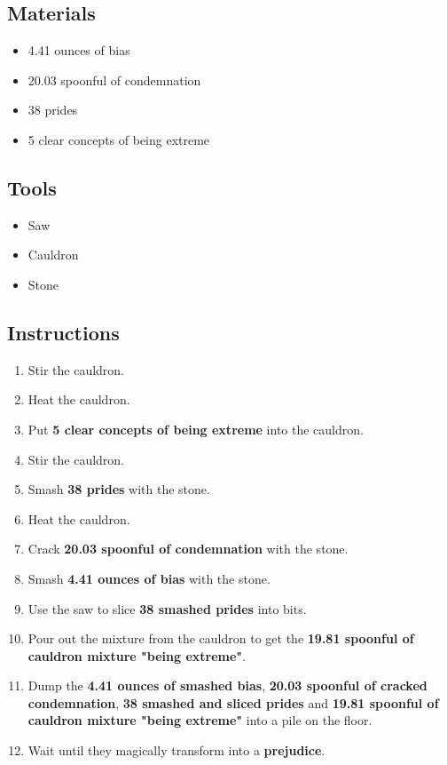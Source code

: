 \documentclass{article}
\begin{document}
\subsection{Materials}\begin{itemize}
\item 
4.41 ounces of bias
\item 
20.03 spoonful of condemnation
\item 
38 prides
\item 
5 clear concepts of being extreme
\end{itemize}
\subsection{Tools}\begin{itemize}
\item 
Saw
\item 
Cauldron
\item 
Stone
\end{itemize}
\subsection{Instructions}\begin{enumerate}
\item 
Stir the cauldron.
\item 
Heat the cauldron.
\item 
Put \textbf{5 clear concepts of being extreme} into the cauldron.
\item 
Stir the cauldron.
\item 
Smash \textbf{38 prides} with the stone.
\item 
Heat the cauldron.
\item 
Crack \textbf{20.03 spoonful of condemnation} with the stone.
\item 
Smash \textbf{4.41 ounces of bias} with the stone.
\item 
Use the saw to slice \textbf{38 smashed prides} into bits.
\item 
Pour out the mixture from the cauldron to get the \textbf{19.81 spoonful of cauldron mixture "being extreme"}.
\item 
Dump the \textbf{4.41 ounces of smashed bias}, \textbf{20.03 spoonful of cracked condemnation}, \textbf{38 smashed and sliced prides} and \textbf{19.81 spoonful of cauldron mixture "being extreme"} into a pile on the floor.
\item 
Wait until they magically transform into a \textbf{prejudice}.
\end{enumerate}
\newpage
\end{document}
